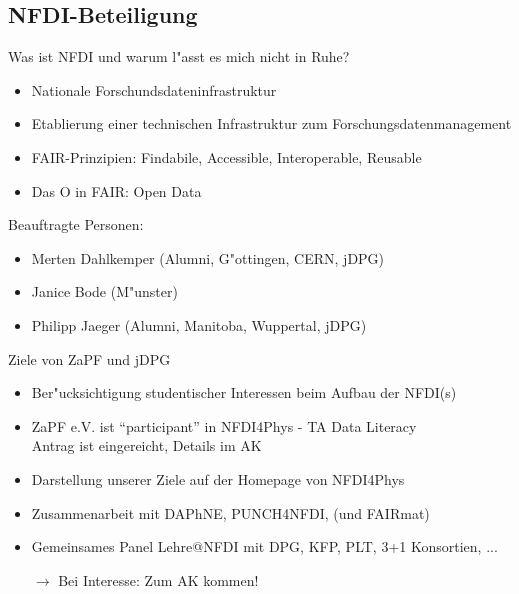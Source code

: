 \documentclass[compress, aspectratio=169]{beamer}
\begin{document}
\subsection{NFDI-Beteiligung}
\begin{frame}{\insertsubsection}
	\vspace{-3mm}
	\begin{block}{Was ist NFDI und warum l"asst es mich nicht in Ruhe?}
		\begin{itemize}
			\item Nationale Forschundsdateninfrastruktur
			\item Etablierung einer technischen Infrastruktur zum Forschungsdatenmanagement
			\item FAIR-Prinzipien: Findabile, Accessible, Interoperable, Reusable
			\item \glqq Das O in FAIR\grqq: Open Data
		\end{itemize}
	\end{block}
	\pause
	\vspace{4mm}
	\scriptsize
	Beauftragte Personen:
	\begin{itemize}
		\item Merten Dahlkemper (Alumni, G"ottingen, CERN, jDPG)
		\item Janice Bode (M"unster)
		\item Philipp Jaeger (Alumni, Manitoba, Wuppertal, jDPG)
	\end{itemize}
\end{frame}
\begin{frame}{\insertsubsection}
	Ziele von ZaPF und jDPG
	\begin{itemize}
		\item Ber"ucksichtigung studentischer Interessen beim Aufbau der NFDI(s)
 		\item ZaPF e.V. ist ``participant'' in NFDI4Phys - TA Data Literacy\\
 		      Antrag ist eingereicht, Details im AK
 		\item Darstellung unserer Ziele auf der Homepage von NFDI4Phys
 		\item Zusammenarbeit mit DAPhNE, PUNCH4NFDI, (und FAIRmat) 
 		\item Gemeinsames Panel Lehre@NFDI mit DPG, KFP, PLT, 3+1 Konsortien, ...
 		\vspace{4mm}\item[$\rightarrow$] Bei Interesse: Zum AK kommen!
 	\end{itemize}
 \end{frame}
\end{document}
